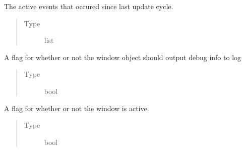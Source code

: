 \documentclass[letterpaper,10pt,english,openany,oneside]{sphinxmanual}
\begin{document}
\begin{fulllineitems}
\begin{fulllineitems}
\end{fulllineitems}



\begin{fulllineitems}

\pysigstartsignatures
{}
\pysigstopsignatures
\sphinxAtStartPar
The active events that occured since last update cycle.
\begin{quote}\begin{description}
\item[{Type}] \leavevmode
\sphinxAtStartPar
list

\end{description}\end{quote}

\end{fulllineitems}



\begin{fulllineitems}

\pysigstartsignatures
{}
\pysigstopsignatures
\sphinxAtStartPar
A flag for whether or not the window object should output debug info to log
\begin{quote}\begin{description}
\item[{Type}] \leavevmode
\sphinxAtStartPar
bool

\end{description}\end{quote}

\end{fulllineitems}



\begin{fulllineitems}

\pysigstartsignatures
{}
\pysigstopsignatures
\sphinxAtStartPar
A flag for whether or not the window is active.
\begin{quote}\begin{description}
\item[{Type}] \leavevmode
\sphinxAtStartPar
bool

\end{description}\end{quote}

\end{fulllineitems}



\begin{fulllineitems}


\end{fulllineitems}
\end{fulllineitems}
\end{document}
